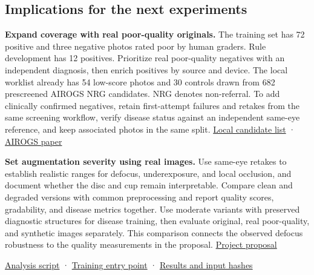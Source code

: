 \documentclass[
  10pt,
]{article}
\begin{document}
\subsection{Implications for the next
experiments}\label{implications-for-the-next-experiments}

\textbf{Expand coverage with real poor-quality originals.} The training
set has 72 positive and three negative photos rated poor by human
graders. Rule development has 12 positives. Prioritize real poor-quality
negatives with an independent diagnosis, then enrich positives by source
and device. The local worklist already has 54 low-score photos and 30
controls drawn from 682 prescreened AIROGS NRG candidates. NRG denotes
non-referral. To add clinically confirmed negatives, retain
first-attempt failures and retakes from the same screening workflow,
verify disease status against an independent same-eye reference, and
keep associated photos in the same split.
\href{../../../runs/quality_alignment_20261116/airogs_blinded_quality_review.csv}{Local
candidate list} · \href{https://arxiv.org/html/2302.01738}{AIROGS paper}

\textbf{Set augmentation severity using real images.} Use same-eye
retakes to establish realistic ranges for defocus, underexposure, and
local occlusion, and document whether the disc and cup remain
interpretable. Compare clean and degraded versions with common
preprocessing and report quality scores, gradability, and disease
metrics together. Use moderate variants with preserved diagnostic
structures for disease training, then evaluate original, real
poor-quality, and synthetic images separately. This comparison connects
the observed defocus robustness to the quality measurements in the
proposal. \href{../../../proposal-1106.pdf}{Project proposal}

\href{../../../tools/analyze_matched_defocus_20261116.py}{Analysis
script} · \href{../../../tools/run_matched_defocus_20261116.py}{Training
entry point} · \href{completed-matched-defocus.json}{Results and input
hashes}
\end{document}

